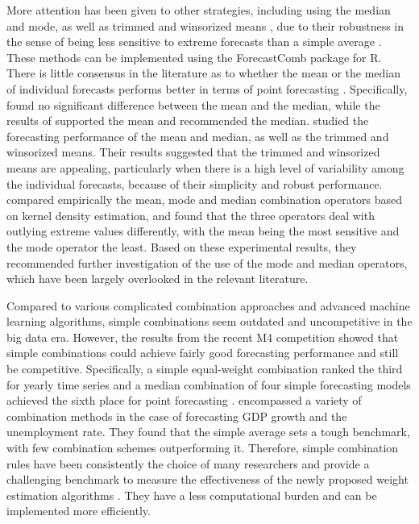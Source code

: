 \documentclass[11pt]{article}
\newcommand{\pkg}[1]{{\normalfont\fontseries{b}\selectfont #1}}
\let\proglang=\textsf
\begin{document}
More attention has been given to other strategies, including using the median and mode, as well as trimmed and winsorized means \citep[e.g.,][]{Chan1999-io,Stock2004-rq,Genre2013-ut,Jose2014-uh,Grushka-Cockayne2017-dj}, due to their robustness in the sense of being less sensitive to extreme forecasts than a simple average \citep{Lichtendahl2020-ut}. These methods can be implemented using the \pkg{ForecastComb} package for \proglang{R}. There is little consensus in the literature as to whether the mean or the median of individual forecasts performs better in terms of point forecasting \citep{Kolassa2011-ai}. Specifically, \citet{McNees1992-qc} found no significant difference between the mean and the median, while the results of \citet{Stock2004-rq} supported the mean and \citet{Agnew1985-dj} recommended the median. \citet{Jose2008-vm} studied the forecasting performance of the mean and median, as well as the trimmed and winsorized means. Their results suggested that the trimmed and winsorized means are appealing, particularly when there is a high level of variability among the individual forecasts, because of their simplicity and robust performance. \citet{Kourentzes2014-hs} compared empirically the mean, mode and median combination operators based on kernel density estimation, and found that the three operators deal with outlying extreme values differently, with the mean being the most sensitive and the mode operator the least. Based on these experimental results, they recommended further investigation of the use of the mode and median operators, which have been largely overlooked in the relevant literature.

Compared to various complicated combination approaches and advanced machine learning algorithms, simple combinations seem outdated and uncompetitive in the big data era. However, the results from the recent M4 competition \citep{Makridakis2020-hu} showed that simple combinations could achieve fairly good forecasting performance and still be competitive. Specifically, a simple equal-weight combination ranked the third for yearly time series \citep{Shaub2019-on} and a median combination of four simple forecasting models achieved the sixth place for point forecasting \citep{Petropoulos2020-fp}. \citet{Genre2013-ut} encompassed a variety of combination methods in the case of forecasting GDP growth and the unemployment rate. They found that the simple average sets a tough benchmark, with few combination schemes outperforming it. Therefore, simple combination rules have been consistently the choice of many researchers and provide a challenging benchmark to measure the effectiveness of the newly proposed weight estimation algorithms \citep[e.g.,][]{Makridakis2000-he,Stock2004-rq,Makridakis2020-hu,Montero-Manso2020-tq,Kang2020-rl,Wang2021-un}. They have a less computational burden and can be implemented more efficiently.
\end{document}

